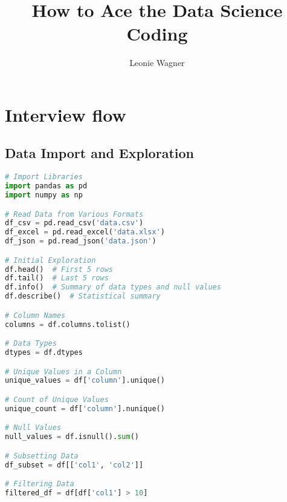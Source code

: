 \documentclass[english, threecolumn]{latex4ei/latex4ei_sheet}
\title{How to Ace the Data Science Coding}
\author{Leonie Wagner}					%
\begin{document}
\ifdefined\GitRevision{}\fi

\maketitle   %


\section{Interview flow}
\begin{sectionbox}
\subsection{Data Import and Exploration}
\begin{lstlisting}[language=python, gobble=0]
# Import Libraries
import pandas as pd
import numpy as np

# Read Data from Various Formats
df_csv = pd.read_csv('data.csv')
df_excel = pd.read_excel('data.xlsx')
df_json = pd.read_json('data.json')

# Initial Exploration
df.head()  # First 5 rows
df.tail()  # Last 5 rows
df.info()  # Summary of data types and null values
df.describe()  # Statistical summary

# Column Names
columns = df.columns.tolist()

# Data Types
dtypes = df.dtypes

# Unique Values in a Column
unique_values = df['column'].unique()

# Count of Unique Values
unique_count = df['column'].nunique()

# Null Values
null_values = df.isnull().sum()

# Subsetting Data
df_subset = df[['col1', 'col2']]

# Filtering Data
filtered_df = df[df['col1'] > 10]

\end{lstlisting}
\end{sectionbox}
\end{document}
